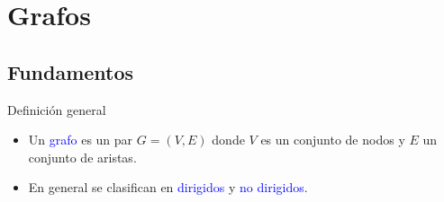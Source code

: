 \documentclass[handout]{beamer} %
\newcommand{\blue}[1]{\textcolor{blue}{#1}}
\begin{document}

\section{Grafos}

\subsection{Fundamentos}

\begin{frame}{Definición general}
    \begin{itemize}
        \item<1-> Un \blue{grafo} es un par $G=(V,E)$ donde $V$ es un conjunto de nodos y $E$ un conjunto de aristas.
        \item<2-> En general se clasifican en  \blue{dirigidos} y  \blue{no dirigidos}.
    \end{itemize}
\end{frame}
\end{document}
